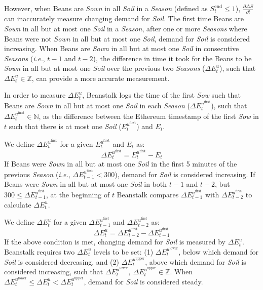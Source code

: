 \documentclass[tikz]{article}
\newcommand{\term}[1]{\textsl{#1}}
\begin{document}
\newpage
However, when Beans are \term{Sown} in all \term{Soil} in a \term{Season} (defined as $S_t^{\text{end}} \leq 1$), $\frac{\partial \Delta S}{\partial t}$ can inaccurately measure changing demand for \term{Soil}. The first time Beans are \term{Sown} in all but at most one \term{Soil} in a \term{Season}, after one or more \term{Seasons} where Beans were not \term{Sown} in all but at most one \term{Soil}, demand for \term{Soil} is considered increasing. When Beans are \term{Sown} in all but at most one \term{Soil} in consecutive \term{Seasons} (\term{i.e.}, $t-1$ and $t-2$), the difference in time it took for the Beans to be \term{Sown} in all but at most one \term{Soil} over the previous two \term{Seasons} ($\Delta E_{t}^{u}$), such that $\Delta E_{t}^{u} \in \mathbb{Z}$, can provide a more accurate measurement. 

In order to measure $\Delta E_{t}^{u}$, Beanstalk logs the time of the first \term{Sow} such that Beans are \term{Sown} in all but at most one \term{Soil} in each \term{Season} ($\Delta E_{t}^{u^{\text{first}}}$), such that $\Delta E_{t}^{u^{\text{first}}} \in \mathbb{N}$, as the difference between the Ethereum timestamp of the first \term{Sow} in $t$ such that there is at most one \term{Soil} ($E_{t}^{u^{\text{first}}}$) and $E_t$. 

We define $\Delta E_{t}^{u^{\text{first}}}$ for a given $E_{t}^{u^{\text{first}}}$ and $E_t$ as:
$$\Delta E_{t}^{u^{\text{first}}} = E_{t}^{u^{\text{first}}} - E_t$$
If Beans were \term{Sown} in all but at most one \term{Soil} in the first 5 minutes of the previous \term{Season} (\term{i.e.}, $\Delta E_{t-1}^{u^{\text{first}}} < 300$), demand for \term{Soil} is considered increasing. If Beans were \term{Sown} in all but at most one \term{Soil} in both $t-1$ and $t-2$, but $300 \leq \Delta E_{t-1}^{u^{\text{first}}}$, at the beginning of $t$ Beanstalk compares $\Delta E_{t-1}^{u^{\text{first}}}$ with $\Delta E_{t-2}^{u^{\text{first}}}$ to calculate $\Delta E_{t}^{u}$.

We define $\Delta E_{t}^{u}$ for a given $\Delta E_{t-1}^{u^{\text{first}}}$ and $\Delta E_{t-2}^{u^{\text{first}}}$ as:
$$\Delta E_{t}^{u} = \Delta E_{t-2}^{u^{\text{first}}} - \Delta E_{t-1}^{u^{\text{first}}}$$
If the above condition is met, changing demand for \term{Soil} is measured by $\Delta E_{t}^{u}$. Beanstalk requires two $\Delta E_{t}^{u}$ levels to be set: (1) $\Delta E_{t}^{u^{\text{lower}}}$, below which demand for \term{Soil} is considered decreasing, and (2) $\Delta E_{t}^{u^{\text{upper}}}$, above which demand for \term{Soil} is considered increasing, such that $\Delta E_{t}^{u^{\text{lower}}},\ \Delta E_{t}^{u^{\text{upper}}} \in \mathbb{Z}$. When $\Delta E_{t}^{u^{\text{lower}}} \leq \Delta E_{t}^{u} < \Delta E_{t}^{u^{\text{upper}}}$, demand for \term{Soil} is considered steady.
\end{document}
